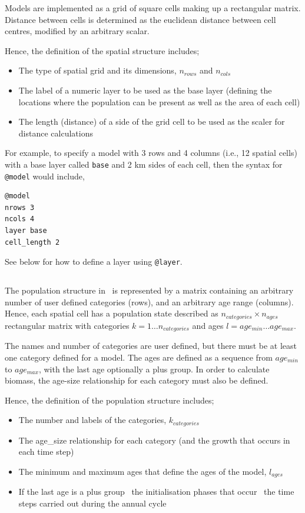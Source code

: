 Models are implemented as a grid of square cells making up a rectangular matrix. Distance between cells is determined as the euclidean distance between cell centres, modified by an arbitrary scalar. 

Hence, the definition of the spatial structure includes;
\begin{itemize}
\item The type of spatial grid and its dimensions, $n_{rows}$ and $n_{cols}$
\item The label of a numeric layer to be used as the base layer (defining the locations where the population can be present as well as the area of each cell)
\item The length (distance) of a side of the grid cell to be used as the scaler for distance calculations
\end{itemize}

For example, to specify a model with 3 rows and 4 columns (i.e., 12 spatial cells) with a base layer called \texttt{base} and 2 km sides of each cell, then the syntax for \texttt{@model} would include,
{\small{\begin{verbatim}
@model
nrows 3
ncols 4
layer base
cell_length 2
\end{verbatim}}}

See below for how to define a layer using \texttt{@layer}. 

\subsection{}

The population structure in \SPM\ is represented by a matrix containing an arbitrary number of user defined categories (rows), and an arbitrary age range (columns). Hence, each spatial cell has a population state described as $n_{categories} \times n_{ages}$ rectangular matrix with categories $k=1 \ldots n_{categories}$ and ages $l=age_{min} \ldots age_{max}$. 

The names and number of categories are user defined, but there must be at least one category defined for a model. The ages are defined as a sequence from $age_{min}$ to $age_{max}$, with the last age optionally a plus group. In order to calculate biomass, the age-size relationship for each category must also be defined.

Hence, the definition of the population structure includes;
\begin{itemize}
  \item The number and labels of the categories, $k_{categories}$
	\item The age\_size relationship for each category (and the growth that occurs in each time step)
  \item The minimum and maximum ages that define the ages of the model, $l_{ages}$
  \item If the last age is a plus group
	\ the initialisation phases that occur
	\ the time steps carried out during the annual cycle
\end{itemize}

